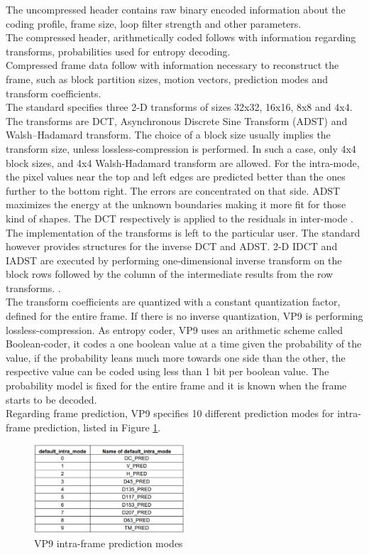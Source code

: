 \documentclass[a4paper,11pt,oneside]{article}
\begin{document}
The uncompressed header contains raw binary encoded information about the coding profile, frame size, loop filter strength and other parameters. \\
The compressed header, arithmetically coded follows with information regarding transforms, probabilities used for entropy decoding.\\
Compressed frame data follow with information necessary to reconstruct the frame, such as block partition sizes, motion vectors, prediction modes and transform coefficients.\\
\indent The standard specifies three 2-D transforms of sizes 32x32, 16x16, 8x8 and 4x4. The transforms are DCT, Asynchronous Discrete Sine Transform (ADST) and Walsh–Hadamard transform. The choice of a block size usually implies the transform size, unless lossless-compression is performed. In such a case, only 4x4 block sizes, and 4x4 Walsh-Hadamard transform are allowed. For the intra-mode, the pixel values near the top and left edges are predicted better than the ones further to the bottom right. The errors are concentrated on that side. ADST maximizes the energy at the unknown boundaries making it more fit for those kind of shapes. The DCT respectively is applied to the residuals in inter-mode \cite[pp.~16]{vp9_bitstream}. The implementation of the transforms is left to the particular user. The standard however provides structures for the inverse DCT and ADST. 2-D IDCT and IADST are executed by performing one-dimensional inverse transform on the block rows followed by the column of the intermediate results from the row transforms. \cite[pp.~18-19]{vp9_bitstream}. \\
\indent The transform coefficients are quantized with a constant quantization factor, defined for the entire frame. If there is no inverse quantization, VP9 is performing lossless-compression.
\indent As entropy coder, VP9 uses an arithmetic scheme called Boolean-coder, it codes a one boolean value at a time given the probability of the value, if the probability leans much more towards one side than the other, the respective value can be coded using less than 1 bit per boolean value. The probability model is fixed for the entire frame and it is known when the frame starts to be decoded. \cite[pp.~77]{vp9_bitstream}\\
\indent Regarding frame prediction, VP9 specifies 10 different prediction modes for intra-frame prediction, listed in Figure \ref{figure:vp9_intra_modes}.\\
\begin{figure}[h]
  \centering
  \includegraphics[width=0.5\textwidth]{../figures/intra-mods.pdf}
  \caption{VP9 intra-frame prediction modes \cite[pp.~71]{vp9_bitstream}}
  \label{figure:vp9_intra_modes}
\end{figure} \\
\end{document}
